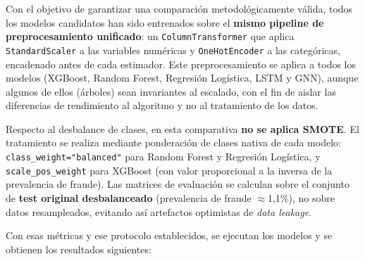 \documentclass[12pt,a4paper]{report}
\begin{document}
Con el objetivo de garantizar una comparación metodológicamente válida, todos los modelos candidatos han sido entrenados sobre el \textbf{mismo pipeline de preprocesamiento unificado}: un \texttt{ColumnTransformer} que aplica \texttt{StandardScaler} a las variables numéricas y \texttt{OneHotEncoder} a las categóricas, encadenado antes de cada estimador. Este preprocesamiento se aplica a todos los modelos (XGBoost, Random Forest, Regresión Logística, LSTM y GNN), aunque algunos de ellos (árboles) sean invariantes al escalado, con el fin de aislar las diferencias de rendimiento al algoritmo y no al tratamiento de los datos.

Respecto al desbalance de clases, en esta comparativa \textbf{no se aplica SMOTE}. El tratamiento se realiza mediante ponderación de clases nativa de cada modelo: \texttt{class\_weight="balanced"} para Random Forest y Regresión Logística, y \texttt{scale\_pos\_weight} para XGBoost (con valor proporcional a la inversa de la prevalencia de fraude). Las matrices de evaluación se calculan sobre el conjunto de \textbf{test original desbalanceado} (prevalencia de fraude $\approx$1,1\%), no sobre datos resampleados, evitando así artefactos optimistas de \textit{data leakage}.

Con esas métricas y ese protocolo establecidos, se ejecutan los modelos y se obtienen los resultados siguientes:

\begin{table}[htbp]
    \centering
    \caption{Comparación de Modelos de Clasificación}
    \label{tab:comparacion_modelos}
\end{table}
\end{document}
